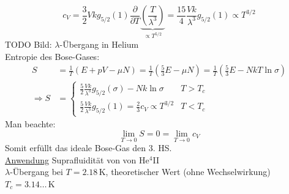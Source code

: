 \begin{enumerate}[A)]
\begin{enumerate}[i)]
        \begin{equation}
            c_V = \frac{3}{2} V k g_{5/2}(1) \frac{\partial}{\partial T} \underbrace{\left( \frac{T}{\lambda^3} \right)}_{\propto T^{5/2}} = \frac{15}{4} \frac{V k }{\lambda^3} g_{5/2}(1) \propto T^{3/2}
        \end{equation}
        TODO Bild: $\lambda$-Übergang in Helium \\ %
        Entropie des Bose-Gases:
        \begin{equation}
            \begin{split}
                S &= \frac{1}{T} \left( E + pV - \mu N \right) = \frac{1}{T} \left( \frac{5}{3} E - \mu N \right) = \frac{1}{T} \left( \frac{5}{3} E - N k T \ln \sigma \right) \\
                \Rightarrow S &=
                \begin{cases}
                    \frac{5}{2} \frac{V k}{\lambda^3} g_{5/2}(\sigma) - N k \ln \sigma & T > T_c \\
                    \frac{5}{2} \frac{V k}{\lambda^3} g_{5/2}(1) = \frac{2}{3} c_V \propto T^{3/2} & T < T_c
                \end{cases}
            \end{split}
        \end{equation}
        Man beachte:
        \begin{equation}
            \lim_{T \to 0} S = 0 = \lim_{T \to 0} c_V
        \end{equation}
        Somit erfüllt das ideale Bose-Gas den 3. HS. \\
        \underline{Anwendung} Suprafluidität von von He${}^4$II\\
        $\lambda$-Übergang bei $T=2.18\,$K, theoretischer Wert (ohne Wechselwirkung) $T_c = 3.14\ldots\,$K
    \end{enumerate}
\end{enumerate}
